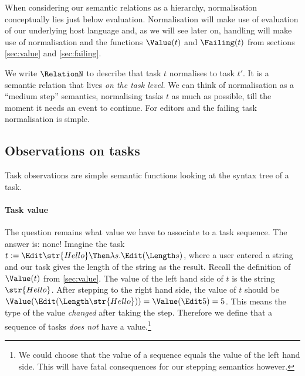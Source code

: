When considering our semantic relations as a hierarchy,
normalisation conceptually lies just below evaluation.
Normalisation will make use of evaluation of our underlying host language and,
as we will see later on,
handling will make use of normalisation
and the functions $\Value(t)$ and $\Failing(t)$ from sections \autoref{sec:value} and \autoref{sec:failing}.

We write $\RelationN$ to describe that
task $t$ normalises to task $t'$.
It is a semantic relation that lives \emph{on the task level}.
We can think of normalisation as a \enquote{medium step} semantics,
normalising tasks $t$ as much as possible,
till the moment it needs an event to continue.
For editors and the failing task normalisation is simple.



\subsection{Observations on tasks}

Task observations are simple semantic functions looking at the syntax tree of a task.



\paragraph{Task value}

The question remains what value we have to associate to a task sequence.
The answer is: none!
Imagine the task $t := \Edit \str{Hello} \Then \lambda s.\allowbreak\Edit (\Length s)$,
where a user entered a string and our task gives the length of the string as the result.
Recall the definition of $\Value(t)$ from \autoref{sec:value}.
The value of the left hand side of $t$ is the string $\str{Hello}$.
After stepping to the right hand side,
the value of $t$ should be $\Value(\Edit (\Length\str{Hello})) = \Value(\Edit 5) = 5$.
This means the type of the value \emph{changed} after taking the step.
Therefore we define that a sequence of tasks \emph{does not} have a value.\footnote{
  We could choose that the value of a sequence equals the value of the left hand side.
  This will have fatal consequences for our stepping semantics however.
}

